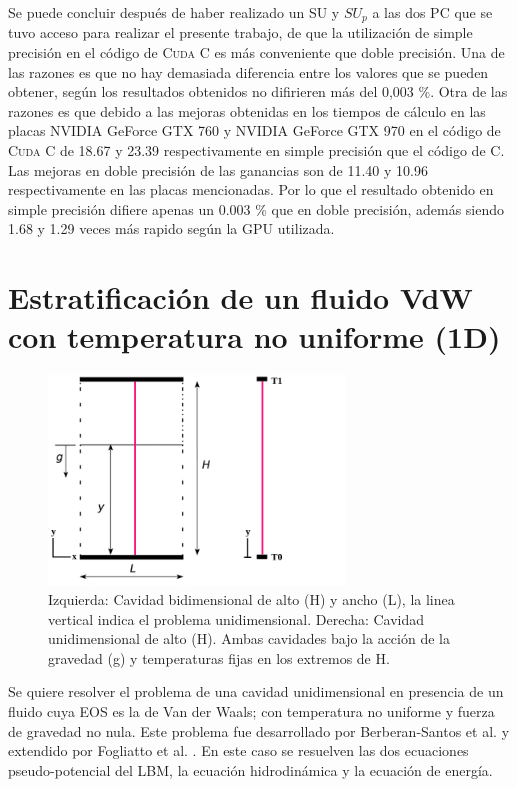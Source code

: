 Se puede concluir después de haber realizado un SU y $SU_p$ a las dos PC que se tuvo acceso para realizar el presente trabajo, de que la utilización de simple precisión en el código de \textsc{Cuda C} es más conveniente que doble precisión. Una de las razones es que no hay demasiada diferencia entre los valores que se pueden obtener, según los resultados obtenidos no difirieren más del 0,003 \%. Otra de las razones es que debido a las mejoras obtenidas en los tiempos de cálculo en las placas NVIDIA GeForce GTX 760 y NVIDIA GeForce GTX 970 en el código de \textsc{Cuda C} de 18.67 y 23.39 respectivamente en simple precisión que el código de \textsc{C}. Las mejoras en doble precisión de las ganancias son de 11.40 y 10.96 respectivamente en las placas mencionadas. Por lo que el resultado obtenido en simple precisión difiere apenas un 0.003 \% que en doble precisión, además siendo 1.68 y 1.29 veces más rapido según la GPU utilizada.

\newpage

\section{Estratificación de un fluido VdW con temperatura no uniforme (1D)}

\begin{figure}[htbp]
	\centering
	\includegraphics[width=0.7\textwidth]{figs/cap4/esquema_problema_VdW}
	\caption{Izquierda: Cavidad bidimensional de alto (H) y ancho (L), la linea vertical indica el problema unidimensional. Derecha: Cavidad unidimensional de alto (H). Ambas cavidades bajo la acción de la gravedad (g) y temperaturas fijas en los extremos de H.} 
	\label{fig:esquema_VdW}	
\end{figure}

Se quiere resolver el problema de una cavidad unidimensional en presencia de un fluido cuya EOS es la de Van der Waals; con temperatura  no uniforme y fuerza de gravedad no nula. Este problema fue desarrollado por Berberan-Santos et al. \cite{berberan2002liquid} y extendido por Fogliatto et al. \cite{fogliatto2019simulation}. En este caso se resuelven las dos ecuaciones pseudo-potencial del LBM, la ecuación hidrodinámica y la ecuación de energía.


